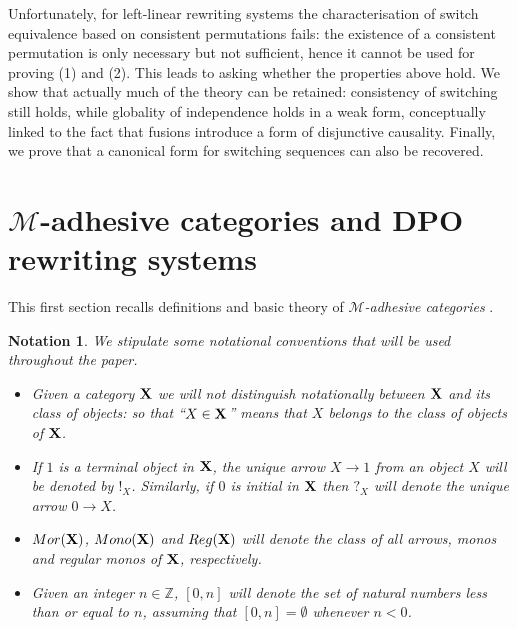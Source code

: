 \documentclass[a4paper,UKenglish,cleveref,pdftex,thm-restate,numberwithinsect,anonymous]{lipics}
\newcommand{\mor}{\mathsf{Mor}}
\newcommand{\mon}{\mathsf{Mono}}
\newcommand{\reg}{\mathsf{Reg}}
\def\X{\textbf {\textup{X}}}
\def\Set{\textbf {\textup{Set}}}
\newtheorem*{notation}{Notation}
\begin{document}
Unfortunately, for left-linear rewriting systems the characterisation
of switch equivalence based on consistent permutations fails: the
existence of a consistent permutation is only necessary but not
sufficient, hence it cannot be used for proving (1) and (2).
%
This leads to asking whether the properties above hold.
We show that actually much of the theory can be retained: consistency
of switching still holds, while globality of independence holds in a
weak form, conceptually linked to the fact that fusions introduce a
form of disjunctive causality. Finally, we prove that a canonical form
for switching sequences can also be recovered.

\section{$\mathcal{M}$-adhesive categories and DPO rewriting systems}\label{sec:ade}

This first section recalls definitions and basic theory of \emph{$\mathcal{M}$-adhesive categories} \cite{azzi2019essence,ehrig2012,ehrig2014adhesive,lack2005adhesive,heindel2009category}.

\begin{notation}
  We stipulate some notational conventions that will be used
  throughout the paper.
  \begin{itemize}
  \item
    Given a category $\X$ we will not distinguish notationally
    between $\X$ and its class of objects: so that ``$X\in \X$'' means
    that $X$ belongs to the class of objects of $\X$.

  \item
    If $1$ is a terminal object in $\X$, the unique
    arrow $X\to 1$ from an object $X$ will be denoted by
    $!_X$. Similarly, if $0$ is initial in $\X$ then $?_X$ will denote
    the unique arrow $0\to
    X$. %

  \item $\mor(\X)$, $\mon(\X)$ and $\reg(\X)$ will denote the class of
    all arrows, monos and regular monos of $\X$, respectively.

  \item Given an integer $n\in \mathbb{Z}$, $[0,n]$ will denote the
    set of natural numbers less than or equal to $n$, assuming that
    $[0,n]=\emptyset$ whenever $n<0$.
  \end{itemize}
\end{notation}
\end{document}
